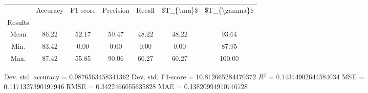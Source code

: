 \begin{tabular}{|c|c|c|c|c|c|c|}
\toprule
{} &  Accuracy &  F1 score &  Precision &  Recall &  \$T\_\{\textbackslash mu\}\$ &  \$T\_\{\textbackslash gamma\}\$ \\
Results &           &           &            &         &            &               \\
\hline
Mean    &     86.22 &     52.17 &      59.47 &   48.22 &      48.22 &         93.64 \\
Min.    &     83.42 &      0.00 &       0.00 &    0.00 &       0.00 &         87.95 \\
Max.    &     87.42 &     55.85 &      90.06 &   60.27 &      60.27 &        100.00 \\
\bottomrule
\end{tabular}

 Dev. std. accuracy = 0.9876563458341362
 Dev. std. F1-score = 10.812665284470372
 $R^2$ = 0.14344902644584034
 MSE = 0.1171327390197946
 RMSE = 0.3422466055635828
 MAE = 0.13820994910746728